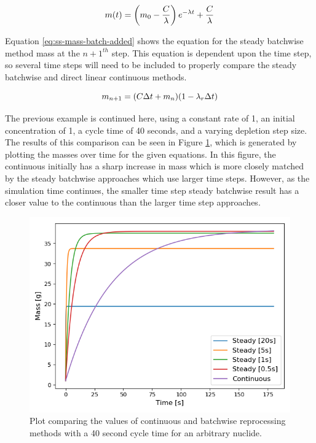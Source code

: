 \begin{equation} \hfill 
m(t) = \left(m_0 - \frac{C}{\lambda} \right) e^{-\lambda t} + \frac{C}{\lambda}
\hfill\label{eq:ss-mass-p7} \end{equation}

Equation \eqref{eq:ss-mass-batch-added} shows the equation for the steady batchwise method mass at the $n+1^{th}$ step. This equation is dependent upon the time step, so several time steps will need to be included to properly compare the steady batchwise and direct linear continuous methods.

\begin{equation} \hfill 
m_{n+1} = (C \Delta t + m_n) (1 - \lambda_r \Delta t)
\hfill\label{eq:ss-mass-batch-added} \end{equation}

The previous example is continued here, using a constant rate of 1, an initial concentration of 1, a cycle time of 40 seconds, and a varying depletion step size. The results of this comparison can be seen in Figure \ref{fig:steady_cont_repr_diff}, which is generated by plotting the masses over time for the given equations. In this figure, the continuous initially has a sharp increase in mass which is more closely matched by the steady batchwise approaches which use larger time steps. However, as the simulation time continues, the smaller time step steady batchwise result has a closer value to the continuous than the larger time step approaches.

\begin{figure}[H]
  \centering
  \includegraphics[scale=0.7]{images/dirlin-steady-comp.png}
  \caption{Plot comparing the values of continuous and batchwise reprocessing methods with a 40 second cycle time for an arbitrary nuclide.}
   \label{fig:steady_cont_repr_diff}
\end{figure}

